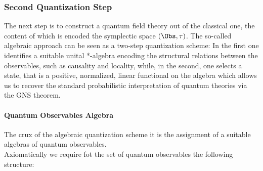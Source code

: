 \documentclass[Main]{subfiles}
\begin{document}
	\subsubsection{Second Quantization Step}%
		The next step is to construct a quantum field theory out of the classical one, the content of which is encoded the symplectic space $(\Obs, \tau)$. 
		The so-called algebraic approach can be seen as a two-step quantization scheme: In the first one identifies a suitable unital  *-algebra encoding the structural relations between the observables, such as causality and locality, while, in the second, one selects a state, that is a positive, normalized, linear functional on the algebra which allows us to recover the standard probabilistic interpretation of quantum theories via the GNS theorem.

		\paragraph{Quantum Observables Algebra}   		
		The crux of the algebraic quantization scheme it is the assignment of a suitable algebras of quantum observables.\\
		Axiomatically we require fot the set of quantum observables the following structure:
		
\end{document}
